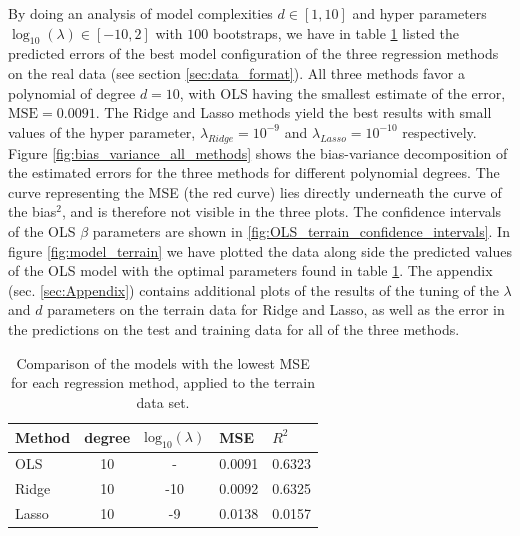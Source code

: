 By doing an analysis of model complexities $d \in [1, 10]$ and hyper parameters $\log_{10}(\lambda) \in [-10, 2]$ with $100$ bootstraps, we have in table \ref{tab:terrain} listed the predicted errors of the best model configuration of the three regression methods on the real data (see section \ref{sec:data_format}). All three methods favor a polynomial of degree $d=10$, with OLS having the smallest estimate of the error, $\text{MSE} = 0.0091$. The Ridge and Lasso methods yield the best results with small values of the hyper parameter, $\lambda_{Ridge} = 10^{-9}$ and $\lambda_{Lasso} = 10^{-10}$ respectively. Figure \ref{fig:bias_variance_all_methods} shows the bias-variance decomposition of the estimated errors for the three methods for different polynomial degrees. The curve representing the MSE (the red curve) lies directly underneath the curve of the bias$^2$, and is therefore not visible in the three plots. The confidence intervals of the OLS $\beta$ parameters are shown in  \ref{fig:OLS_terrain_confidence_intervals}. In figure \ref{fig:model_terrain} we have plotted the data along side the predicted values of the OLS model with the optimal parameters found in table \ref{tab:terrain}. The appendix (sec. \ref{sec:Appendix}) contains additional plots of the results of the tuning of the $\lambda$ and $d$ parameters on the terrain data for Ridge and Lasso, as well as the error in the predictions on the test and training data for all of the three methods.

\begin{table}[!h]
    \caption{Comparison of the models with the lowest MSE for each regression method, applied to the terrain data set.}
    \label{tab:terrain}
    \begin{tabular}{|l|c|c|l|l|}
        \hline
        Method & degree & $\text{log}_{10}(\lambda)$ & MSE     & $R^2$  \\ \hline
        OLS    & 10 & - & 0.0091  & 0.6323  \\ \hline
        Ridge  & 10 & -10 & 0.0092  & 0.6325  \\ \hline
        Lasso  & 10 & -9 & 0.0138 & 0.0157 \\ \hline
    \end{tabular}
\end{table}


